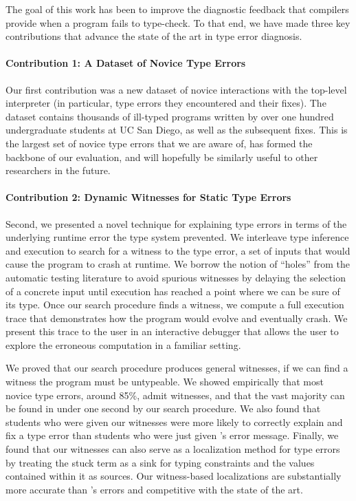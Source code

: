 The goal of this work has been to improve the diagnostic feedback that
compilers provide when a program fails to type-check.
%
To that end, we have made three key contributions that advance the state
of the art in type error diagnosis.

\paragraph{Contribution 1: A Dataset of Novice Type Errors}
Our first contribution was a new dataset of novice interactions with the
\ocaml top-level interpreter (in particular, type errors they
encountered and their fixes).
%
The dataset contains thousands of ill-typed programs written by over one
hundred undergraduate students at UC San Diego, as well as the
subsequent fixes.
%
This is the largest set of novice type errors that we are aware of, has
formed the backbone of our evaluation, and will hopefully be similarly
useful to other researchers in the future.

\paragraph{Contribution 2: Dynamic Witnesses for Static Type Errors}
Second, we presented a novel technique for explaining type errors in
terms of the underlying runtime error the type system prevented.
%
We interleave type inference and execution to search for a witness to
the type error, a set of inputs that would cause the program to crash
at runtime.
%
We borrow the notion of ``holes'' from the automatic testing literature
to avoid spurious witnesses by delaying the selection of a concrete
input until execution has reached a point where we can be sure of its
type.
%
Once our search procedure finds a witness, we compute a full execution
trace that demonstrates how the program would evolve and eventually
crash.
%
We present this trace to the user in an interactive debugger that allows
the user to explore the erroneous computation in a familiar setting.

We proved that our search procedure produces general witnesses, \ie if
we can find a witness the program must be untypeable.
%
We showed empirically that most novice type errors, around 85\%, admit
witnesses, and that the vast majority can be found in under one second
by our search procedure.
%
We also found that students who were given our witnesses were more
likely to correctly explain and fix a type error than students who were
just given \ocaml's error message.
%
Finally, we found that our witnesses can also serve as a localization
method for type errors by treating the stuck term as a sink for typing
constraints and the values contained within it as sources.
%
Our witness-based localizations are substantially more accurate than
\ocaml's errors and competitive with the state of the art.

